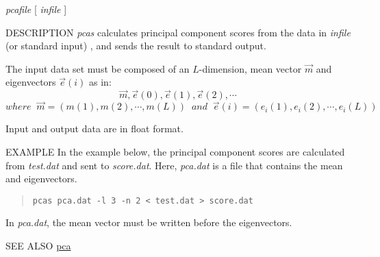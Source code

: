 \begin{synopsis}
 \item[pcas] [ --l $L$ ] [ --n $N$] {\em pcafile} [ {\em infile} ] 
\end{synopsis}

\begin{qsection}{DESCRIPTION}
 {\em pcas} calculates principal component scores
 from the data in {\em infile} (or standard input) ,
 and sends the result to standard output.

 The input data set must be composed of an $L$-dimension,
 mean vector $\Vec{m}$ and eigenvectors $\Vec{e}(i)$ as in:
\[
 \Vec{m}, \Vec{e}(0), \Vec{e}(1), \Vec{e}(2), \cdots
 \]
 \[
 where\;\;\Vec{m} = (m(1), m(2), \cdots, m(L))\;\;and\;\;
 \Vec{e}(i) = (e_{i}(1), e_{i}(2), \cdots, e_{i}(L))
\]

Input and output data are in float format. 
\end{qsection}

\begin{options}
\end{options}


\begin{qsection}{EXAMPLE}
 In the example below,
 the principal component scores are calculated
 from {\em test.dat} and sent to {\em score.dat}. Here, {\em pca.dat}
 is a file that contains the mean and eigenvectors.
\begin{quote}
  \verb!pcas pca.dat -l 3 -n 2 < test.dat > score.dat!
\end{quote} 
In {\em pca.dat}, the mean vector must be written before the eigenvectors.
\end{qsection} 
\begin{qsection}{SEE ALSO}
 \hyperlink{pca}{pca}
\end{qsection}
